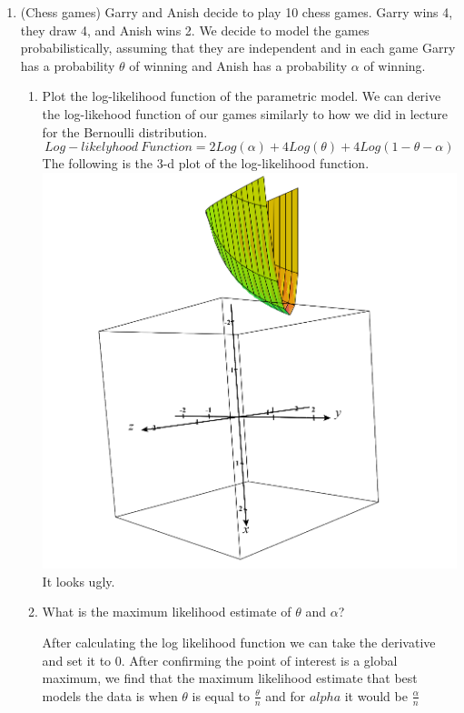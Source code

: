 \documentclass[12pt,twoside]{article}
\begin{document}
\begin{enumerate}
\break


\item (Chess games) Garry and Anish decide to play 10 chess games. Garry wins 4, they draw 4, and Anish wins 2. We decide to model the games probabilistically, assuming that they are independent and in each game Garry has a probability $\theta$ of winning and Anish has a probability $\alpha$ of winning.

\begin{enumerate} 
\item Plot the log-likelihood function of the parametric model.
\subitem We can derive the log-likehood function of our games similarly to how we did in lecture for the Bernoulli distribution. 
$$
    Log-likelyhood \ Function = 2Log(\alpha) + 4Log(\theta) + 4Log(1-\theta - \alpha)
$$
The following is the 3-d plot of the log-likelihood function. \\

\includegraphics[scale=.5]{hw2 3d plot.png}
\\
It looks ugly. 

\item What is the maximum likelihood estimate of $\theta$ and $\alpha$?
\subitem

After calculating the log likelihood function we can take the derivative and set it to 0. After confirming the point of interest is a global maximum, we find that the maximum likelihood estimate that best models the data is when  $\theta$ is equal to $\frac{\theta}{n}$ and for $alpha$ it would be $\frac{\alpha}{n}$\\


\end{enumerate}
\end{enumerate}
\end{document}

